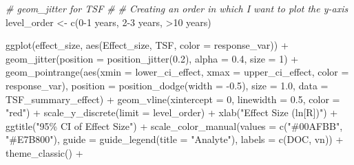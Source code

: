\documentclass[
]{article}
\newenvironment{Shaded}{\begin{snugshade}}{\end{snugshade}}
\newcommand{\AttributeTok}[1]{\textcolor[rgb]{0.77,0.63,0.00}{#1}}
\newcommand{\CommentTok}[1]{\textcolor[rgb]{0.56,0.35,0.01}{\textit{#1}}}
\newcommand{\DecValTok}[1]{\textcolor[rgb]{0.00,0.00,0.81}{#1}}
\newcommand{\FloatTok}[1]{\textcolor[rgb]{0.00,0.00,0.81}{#1}}
\newcommand{\FunctionTok}[1]{\textcolor[rgb]{0.00,0.00,0.00}{#1}}
\newcommand{\NormalTok}[1]{#1}
\newcommand{\OtherTok}[1]{\textcolor[rgb]{0.56,0.35,0.01}{#1}}
\newcommand{\SpecialCharTok}[1]{\textcolor[rgb]{0.00,0.00,0.00}{#1}}
\newcommand{\StringTok}[1]{\textcolor[rgb]{0.31,0.60,0.02}{#1}}
\begin{document}
\begin{Shaded}
\begin{Highlighting}[]
\CommentTok{\# geom\_jitter for TSF \# }
\CommentTok{\# Creating an order in which I want to plot the y{-}axis}
\NormalTok{level\_order }\OtherTok{\textless{}{-}} \FunctionTok{c}\NormalTok{(}\StringTok{\textquotesingle{}0{-}1 years\textquotesingle{}}\NormalTok{, }\StringTok{\textquotesingle{}2{-}3 years\textquotesingle{}}\NormalTok{, }\StringTok{\textquotesingle{}\textgreater{}10 years\textquotesingle{}}\NormalTok{) }

\FunctionTok{ggplot}\NormalTok{(effect\_size, }\FunctionTok{aes}\NormalTok{(Effect\_size, TSF, }\AttributeTok{color =}\NormalTok{ response\_var)) }\SpecialCharTok{+}
  \FunctionTok{geom\_jitter}\NormalTok{(}\AttributeTok{position =} \FunctionTok{position\_jitter}\NormalTok{(}\FloatTok{0.2}\NormalTok{), }\AttributeTok{alpha =} \FloatTok{0.4}\NormalTok{, }\AttributeTok{size =} \DecValTok{1}\NormalTok{) }\SpecialCharTok{+}
  \FunctionTok{geom\_pointrange}\NormalTok{(}\FunctionTok{aes}\NormalTok{(}\AttributeTok{xmin =}\NormalTok{ lower\_ci\_effect, }\AttributeTok{xmax =}\NormalTok{ upper\_ci\_effect, }
                      \AttributeTok{color =}\NormalTok{ response\_var),}
                      \AttributeTok{position =} \FunctionTok{position\_dodge}\NormalTok{(}\AttributeTok{width =} \SpecialCharTok{{-}}\FloatTok{0.5}\NormalTok{), }\AttributeTok{size =} \FloatTok{1.0}\NormalTok{, }\AttributeTok{data =}\NormalTok{ TSF\_summary\_effect) }\SpecialCharTok{+}
  \FunctionTok{geom\_vline}\NormalTok{(}\AttributeTok{xintercept =} \DecValTok{0}\NormalTok{, }\AttributeTok{linewidth =} \FloatTok{0.5}\NormalTok{, }\AttributeTok{color =} \StringTok{"red"}\NormalTok{) }\SpecialCharTok{+}
  \FunctionTok{scale\_y\_discrete}\NormalTok{(}\AttributeTok{limit =}\NormalTok{ level\_order) }\SpecialCharTok{+}
  \FunctionTok{xlab}\NormalTok{(}\StringTok{"Effect Size (ln[R])"}\NormalTok{) }\SpecialCharTok{+}
  \FunctionTok{ggtitle}\NormalTok{(}\StringTok{"95\% CI of Effect Size"}\NormalTok{) }\SpecialCharTok{+}
  \FunctionTok{scale\_color\_manual}\NormalTok{(}\AttributeTok{values =} \FunctionTok{c}\NormalTok{(}\StringTok{"\#00AFBB"}\NormalTok{, }\StringTok{"\#E7B800"}\NormalTok{),}
                     \AttributeTok{guide =} \FunctionTok{guide\_legend}\NormalTok{(}\AttributeTok{title =} \StringTok{"Analyte"}\NormalTok{),}
                     \AttributeTok{labels =} \FunctionTok{c}\NormalTok{(}\StringTok{\textquotesingle{}DOC\textquotesingle{}}\NormalTok{, vn)) }\SpecialCharTok{+}
  \FunctionTok{theme\_classic}\NormalTok{() }\SpecialCharTok{+}

\end{Highlighting}
\end{Shaded}
\end{document}
